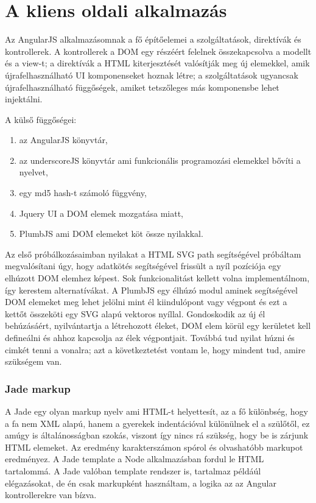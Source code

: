 \section{A kliens oldali alkalmazás}



Az AngularJS alkalmazásomnak a fő építőelemei a szolgáltatások, direktívák és kontrollerek. A kontrollerek a DOM egy részéért felelnek összekapcsolva a modellt és a view-t; a direktívák a HTML kiterjesztését valósítják meg új elemekkel, amik újrafelhasználható UI komponenseket hoznak létre; a szolgáltatások ugyancsak újrafelhasználható függőségek, amiket tetszőleges más komponensbe lehet injektálni.

A külső függőségei: 
\begin{enumerate}
\item az AngularJS könyvtár, 
\item az underscoreJS könyvtár ami funkcionális programozási elemekkel bővíti a nyelvet,
\item egy md5 hash-t számoló függvény,
\item Jquery UI a DOM elemek mozgatása miatt,
\item PlumbJS ami DOM elemeket köt össze nyilakkal.
\end{enumerate}

Az első próbálkozásaimban nyilakat a HTML SVG path segítségével próbáltam megvalósítani úgy, hogy adatkötés segítségével frissült a nyíl pozíciója egy elhúzott DOM elemhez képest. Sok funkcionalitást kellett volna implementálnom, így kerestem alternatívákat. A PlumbJS egy élhúzó modul aminek segítségével DOM elemeket meg lehet jelölni mint él kiindulópont vagy végpont és ezt a kettőt összeköti egy SVG alapú vektoros nyíllal. Gondoskodik az új él behúzásáért, nyilvántartja a létrehozott éleket, DOM elem körül egy kerületet kell defineálni és ahhoz kapcsolja az élek végpontjait. Továbbá tud nyilat húzni és cimkét tenni a vonalra; azt a következtetést vontam le, hogy mindent tud, amire szükségem van.  

\subsubsection{Jade markup}

A Jade egy olyan markup nyelv ami HTML-t helyettesít, az a fő különbség, hogy a fa nem XML alapú, hanem a gyerekek indentációval különülnek el a szülőtől, ez amúgy is általánosságban szokás, viszont így nincs rá szükség, hogy be is zárjunk HTML elemeket. Az eredmény karakterszámon spórol és olvashatóbb markupot eredményez. A Jade template a Node alkalmazásban fordul le HTML tartalommá. A Jade valóban template rendszer is, tartalmaz példáúl elégazásokat, de én csak markupként használtam, a logika az az Angular kontrollerekre van bízva.

